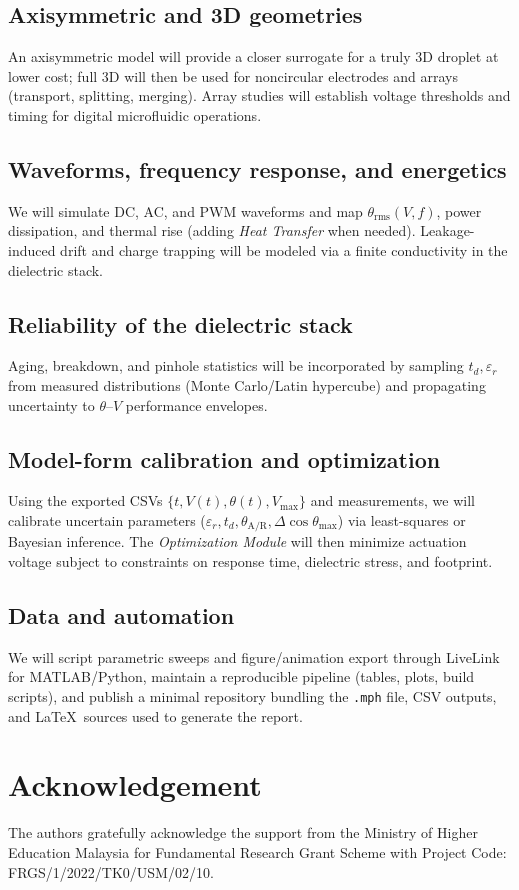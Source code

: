 \documentclass[9pt,a4paper,twocolumn,twoside]{tau-class/tau}
\begin{document}
\subsection{Axisymmetric and 3D geometries}
An axisymmetric model will provide a closer surrogate for a truly 3D droplet at lower cost; full 3D will then be used for noncircular electrodes and arrays (transport, splitting, merging). Array studies will establish voltage thresholds and timing for digital microfluidic operations.

\subsection{Waveforms, frequency response, and energetics}
We will simulate DC, AC, and PWM waveforms and map $\theta_{\mathrm{rms}}(V,f)$, power dissipation, and thermal rise (adding \textit{Heat Transfer} when needed). Leakage-induced drift and charge trapping will be modeled via a finite conductivity in the dielectric stack.

\subsection{Reliability of the dielectric stack}
Aging, breakdown, and pinhole statistics will be incorporated by sampling $t_d,\varepsilon_r$ from measured distributions (Monte Carlo/Latin hypercube) and propagating uncertainty to $\theta$–$V$ performance envelopes.

\subsection{Model-form calibration and optimization}
Using the exported CSVs $\{t,V(t),\theta(t),V_{\max}\}$ and measurements, we will calibrate uncertain parameters ($\varepsilon_r,t_d,\theta_{\mathrm{A/R}}, \Delta\cos\theta_{\max}$) via least-squares or Bayesian inference. The \textit{Optimization Module} will then minimize actuation voltage subject to constraints on response time, dielectric stress, and footprint.

\subsection{Data and automation}
We will script parametric sweeps and figure/animation export through LiveLink for MATLAB/Python, maintain a reproducible pipeline (tables, plots, build scripts), and publish a minimal repository bundling the \texttt{.mph} file, CSV outputs, and \LaTeX\ sources used to generate the report.

\section{Acknowledgement}
The authors gratefully acknowledge the support from the Ministry of Higher Education Malaysia for Fundamental Research Grant Scheme with Project Code: FRGS/1/2022/TK0/USM/02/10.




\printbibliography

\end{document}
